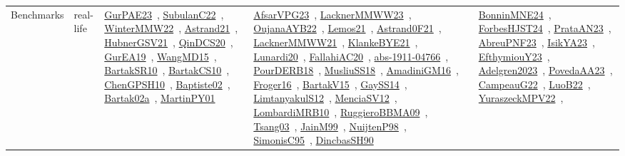 {\begin{longtable}{lp{3cm}>{\raggedright\arraybackslash}p{6cm}>{\raggedright\arraybackslash}p{6cm}>{\raggedright\arraybackslash}p{8cm}}
Benchmarks & real-life & \href{../works/GurPAE23.pdf}{GurPAE23}~\cite{GurPAE23}, \href{../works/SubulanC22.pdf}{SubulanC22}~\cite{SubulanC22}, \href{../works/WinterMMW22.pdf}{WinterMMW22}~\cite{WinterMMW22}, \href{../works/Astrand21.pdf}{Astrand21}~\cite{Astrand21}, \href{../works/HubnerGSV21.pdf}{HubnerGSV21}~\cite{HubnerGSV21}, \href{../works/QinDCS20.pdf}{QinDCS20}~\cite{QinDCS20}, \href{../works/GurEA19.pdf}{GurEA19}~\cite{GurEA19}, \href{../works/WangMD15.pdf}{WangMD15}~\cite{WangMD15}, \href{../works/BartakSR10.pdf}{BartakSR10}~\cite{BartakSR10}, \href{../works/BartakCS10.pdf}{BartakCS10}~\cite{BartakCS10}, \href{../works/ChenGPSH10.pdf}{ChenGPSH10}~\cite{ChenGPSH10}, \href{../works/Baptiste02.pdf}{Baptiste02}~\cite{Baptiste02}, \href{../works/Bartak02a.pdf}{Bartak02a}~\cite{Bartak02a}, \href{../works/MartinPY01.pdf}{MartinPY01}~\cite{MartinPY01} & \href{../works/AfsarVPG23.pdf}{AfsarVPG23}~\cite{AfsarVPG23}, \href{../works/LacknerMMWW23.pdf}{LacknerMMWW23}~\cite{LacknerMMWW23}, \href{../works/OujanaAYB22.pdf}{OujanaAYB22}~\cite{OujanaAYB22}, \href{../works/Lemos21.pdf}{Lemos21}~\cite{Lemos21}, \href{../works/Astrand0F21.pdf}{Astrand0F21}~\cite{Astrand0F21}, \href{../works/LacknerMMWW21.pdf}{LacknerMMWW21}~\cite{LacknerMMWW21}, \href{../works/KlankeBYE21.pdf}{KlankeBYE21}~\cite{KlankeBYE21}, \href{../works/Lunardi20.pdf}{Lunardi20}~\cite{Lunardi20}, \href{../works/FallahiAC20.pdf}{FallahiAC20}~\cite{FallahiAC20}, \href{../works/abs-1911-04766.pdf}{abs-1911-04766}~\cite{abs-1911-04766}, \href{../works/PourDERB18.pdf}{PourDERB18}~\cite{PourDERB18}, \href{../works/MusliuSS18.pdf}{MusliuSS18}~\cite{MusliuSS18}, \href{../works/AmadiniGM16.pdf}{AmadiniGM16}~\cite{AmadiniGM16}, \href{../works/Froger16.pdf}{Froger16}~\cite{Froger16}, \href{../works/BartakV15.pdf}{BartakV15}~\cite{BartakV15}, \href{../works/GaySS14.pdf}{GaySS14}~\cite{GaySS14}, \href{../works/LimtanyakulS12.pdf}{LimtanyakulS12}~\cite{LimtanyakulS12}, \href{../works/MenciaSV12.pdf}{MenciaSV12}~\cite{MenciaSV12}, \href{../works/LombardiMRB10.pdf}{LombardiMRB10}~\cite{LombardiMRB10}, \href{../works/RuggieroBBMA09.pdf}{RuggieroBBMA09}~\cite{RuggieroBBMA09}, \href{../works/Tsang03.pdf}{Tsang03}~\cite{Tsang03}, \href{../works/JainM99.pdf}{JainM99}~\cite{JainM99}, \href{../works/NuijtenP98.pdf}{NuijtenP98}~\cite{NuijtenP98}, \href{../works/SimonisC95.pdf}{SimonisC95}~\cite{SimonisC95}, \href{../works/DincbasSH90.pdf}{DincbasSH90}~\cite{DincbasSH90} & \href{../works/BonninMNE24.pdf}{BonninMNE24}~\cite{BonninMNE24}, \href{../works/ForbesHJST24.pdf}{ForbesHJST24}~\cite{ForbesHJST24}, \href{../works/PrataAN23.pdf}{PrataAN23}~\cite{PrataAN23}, \href{../works/AbreuPNF23.pdf}{AbreuPNF23}~\cite{AbreuPNF23}, \href{../works/IsikYA23.pdf}{IsikYA23}~\cite{IsikYA23}, \href{../works/EfthymiouY23.pdf}{EfthymiouY23}~\cite{EfthymiouY23}, \href{../works/Adelgren2023.pdf}{Adelgren2023}~\cite{Adelgren2023}, \href{../works/PovedaAA23.pdf}{PovedaAA23}~\cite{PovedaAA23}, \href{../works/CampeauG22.pdf}{CampeauG22}~\cite{CampeauG22}, \href{../works/LuoB22.pdf}{LuoB22}~\cite{LuoB22}, \href{../works/YuraszeckMPV22.pdf}{YuraszeckMPV22}~\cite{YuraszeckMPV22}, 
\end{longtable}}
